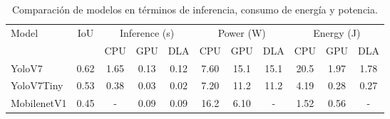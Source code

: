 \documentclass{article}
\begin{document}
\begin{table}[h]
    \centering
    \begin{tabular}{l c | ccc | ccc | ccc}
        \toprule
        Model & IoU & \multicolumn{3}{c|}{Inference (s)} & \multicolumn{3}{c|}{Power (W)} & \multicolumn{3}{c}{Energy (J)} \\
        & & CPU & GPU & DLA & CPU & GPU & DLA & CPU & GPU & DLA \\
        \midrule
        YoloV7       & 0.62 & 1.65 & 0.13 & 0.12 & 7.60 & 15.1 & 15.1 & 20.5 & 1.97 & 1.78 \\
        YoloV7Tiny   & 0.53 & 0.38 & 0.03 & 0.02 & 7.20 & 11.2 & 11.2 & 4.19 & 0.28 & 0.27 \\
        MobilenetV1  & 0.45 & -    & 0.09 & 0.09 & 16.2 & 6.10 & -    & 1.52 & 0.56 & -    \\
        \bottomrule
    \end{tabular}
    \caption{Comparación de modelos en términos de inferencia, consumo de energía y potencia.}
    \label{tab:model_comparison}
\end{table}
\end{document}
